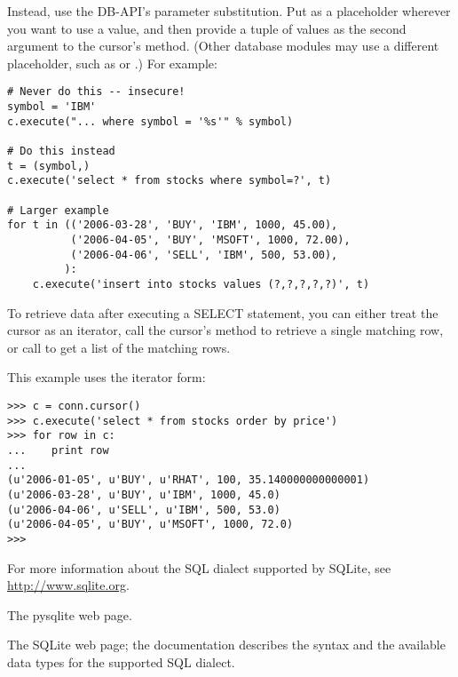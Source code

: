 \documentclass{howto}
\begin{document}
Instead, use the DB-API's parameter substitution.  Put  as a
placeholder wherever you want to use a value, and then provide a tuple
of values as the second argument to the cursor's 
method.  (Other database modules may use a different placeholder,
such as  or .) For example:

\begin{verbatim}    
# Never do this -- insecure!
symbol = 'IBM'
c.execute("... where symbol = '%s'" % symbol)

# Do this instead
t = (symbol,)
c.execute('select * from stocks where symbol=?', t)

# Larger example
for t in (('2006-03-28', 'BUY', 'IBM', 1000, 45.00),
          ('2006-04-05', 'BUY', 'MSOFT', 1000, 72.00),
          ('2006-04-06', 'SELL', 'IBM', 500, 53.00),
         ):
    c.execute('insert into stocks values (?,?,?,?,?)', t)
\end{verbatim}

To retrieve data after executing a SELECT statement, you can either 
treat the cursor as an iterator, call the cursor's 
method to retrieve a single matching row, 
or call  to get a list of the matching rows.

This example uses the iterator form:

\begin{verbatim}
>>> c = conn.cursor()
>>> c.execute('select * from stocks order by price')
>>> for row in c:
...    print row
...
(u'2006-01-05', u'BUY', u'RHAT', 100, 35.140000000000001)
(u'2006-03-28', u'BUY', u'IBM', 1000, 45.0)
(u'2006-04-06', u'SELL', u'IBM', 500, 53.0)
(u'2006-04-05', u'BUY', u'MSOFT', 1000, 72.0)
>>>
\end{verbatim}

For more information about the SQL dialect supported by SQLite, see 
\url{http://www.sqlite.org}.

\begin{seealso}

{The pysqlite web page.}

{The SQLite web page; the documentation describes the syntax and the
available data types for the supported SQL dialect.}


\end{seealso}
\end{document}
